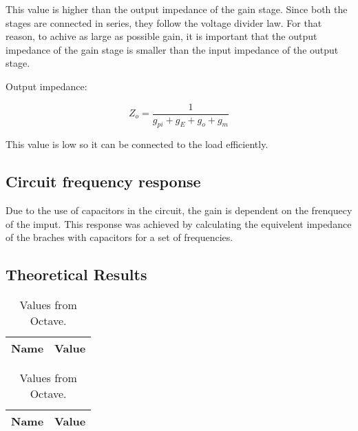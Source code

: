 This value is higher than the output impedance of the gain stage. Since both the stages are connected in series, they follow the voltage divider law. For that reason, to achive as large as possible gain, it is important that the output impedance of the gain stage is smaller than the input impedance of the output stage.

Output impedance:

\[
Z_o = \frac{1}{g_{pi}+g_E+g_o+g_m}
\]

This value is low so it can be connected to the load efficiently.

\subsection {Circuit frequency response}
Due to the use of capacitors in the circuit, the gain is dependent on the frenquecy of the imput. This response was achieved by calculating the equivelent impedance of the braches with capacitors for a set of frequencies.




\subsection{Theoretical Results}
\label{subsec:res_the}

\begin{table}[h]
	\centering
	\begin{tabular}{|l|r|}
		\hline    
		{\bf Name} & {\bf Value} \\ \hline
    		
	\end{tabular}
	
	\caption{Values from Octave.}
    
\label{tab:op_teo}
\end{table}

\begin{table}[h]
	\centering
	\begin{tabular}{|l|r|}
		\hline    
		{\bf Name} & {\bf Value} \\ \hline
    		
	\end{tabular}
	
	\caption{Values from Octave.}
    
\label{tab:imp_teo}
\end{table}
